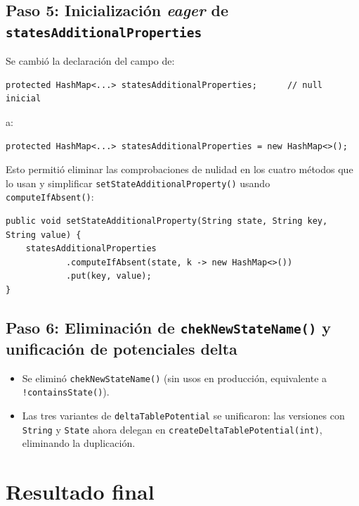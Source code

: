 \documentclass[11pt,a4paper]{article}
\newcommand{\code}[1]{\texttt{#1}}
\begin{document}
\subsection{Paso 5: Inicializaci\'on \emph{eager} de
            \code{statesAdditionalProperties}}

Se cambi\'o la declaraci\'on del campo de:

\begin{lstlisting}
protected HashMap<...> statesAdditionalProperties;      // null inicial
\end{lstlisting}

a:

\begin{lstlisting}
protected HashMap<...> statesAdditionalProperties = new HashMap<>();
\end{lstlisting}

Esto permiti\'o eliminar las comprobaciones de nulidad en los cuatro
m\'etodos que lo usan y simplificar \code{setStateAdditionalProperty()}
usando \code{computeIfAbsent()}:

\begin{lstlisting}
public void setStateAdditionalProperty(String state, String key, String value) {
    statesAdditionalProperties
            .computeIfAbsent(state, k -> new HashMap<>())
            .put(key, value);
}
\end{lstlisting}

\subsection{Paso 6: Eliminaci\'on de \code{chekNewStateName()} y
            unificaci\'on de potenciales delta}

\begin{itemize}
  \item Se elimin\'o \code{chekNewStateName()} (sin usos en producci\'on,
        equivalente a \code{!containsState()}).
  \item Las tres variantes de \code{deltaTablePotential} se unificaron:
        las versiones con \code{String} y \code{State} ahora delegan en
        \code{createDeltaTablePotential(int)}, eliminando la duplicaci\'on.
\end{itemize}

\section{Resultado final}
\label{sec:resultado}
\end{document}
